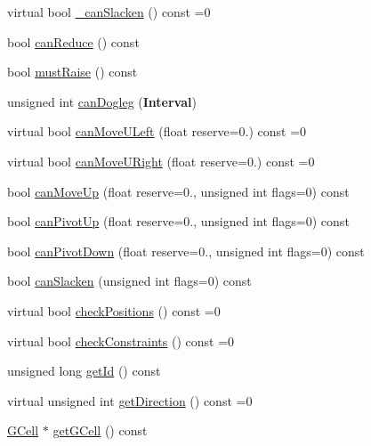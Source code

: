 \begin{DoxyCompactItemize}
\item 
virtual bool \hyperlink{classKatabatic_1_1AutoSegment_a676fcb7ece71d129b7a4d87a3f2e07aa}{\-\_\-can\-Slacken} () const =0
\item 
bool \hyperlink{classKatabatic_1_1AutoSegment_a6191fe9409cee6c5a0429ebb9e653ea4}{can\-Reduce} () const 
\item 
bool \hyperlink{classKatabatic_1_1AutoSegment_abe32548ca8d41da334413928405fec87}{must\-Raise} () const 
\item 
unsigned int \hyperlink{classKatabatic_1_1AutoSegment_a43c865bcfcfd6132352a9ac8a84c25cd}{can\-Dogleg} ({\bf Interval})
\item 
virtual bool \hyperlink{classKatabatic_1_1AutoSegment_aad55626c9d793a0b08bcff5be2a5ad0c}{can\-Move\-U\-Left} (float reserve=0.) const =0
\item 
virtual bool \hyperlink{classKatabatic_1_1AutoSegment_a096deb8a143f098eac2bff9ab9c52243}{can\-Move\-U\-Right} (float reserve=0.) const =0
\item 
bool \hyperlink{classKatabatic_1_1AutoSegment_a02e6ec81411b250d60dccc0da39964a6}{can\-Move\-Up} (float reserve=0., unsigned int flags=0) const 
\item 
bool \hyperlink{classKatabatic_1_1AutoSegment_af76432e1e58e015bde917134757003f9}{can\-Pivot\-Up} (float reserve=0., unsigned int flags=0) const 
\item 
bool \hyperlink{classKatabatic_1_1AutoSegment_a1c810a1a6860202d94c670999546c4b8}{can\-Pivot\-Down} (float reserve=0., unsigned int flags=0) const 
\item 
bool \hyperlink{classKatabatic_1_1AutoSegment_a46f380673fde750e88aad991168a35fd}{can\-Slacken} (unsigned int flags=0) const 
\item 
virtual bool \hyperlink{classKatabatic_1_1AutoSegment_af026a81002bd907f1ccd4a4784aaa1db}{check\-Positions} () const =0
\item 
virtual bool \hyperlink{classKatabatic_1_1AutoSegment_a3d5732fd10b4a05076981066a4674487}{check\-Constraints} () const =0
\item 
unsigned long \hyperlink{classKatabatic_1_1AutoSegment_ae68c47fdf838be02cbf6660cd25a0806}{get\-Id} () const 
\item 
virtual unsigned int \hyperlink{classKatabatic_1_1AutoSegment_ae35b78590ed6aa546b626ef95f28c533}{get\-Direction} () const =0
\item 
\hyperlink{classKatabatic_1_1GCell}{G\-Cell} $\ast$ \hyperlink{classKatabatic_1_1AutoSegment_ab45ccfee0f781ec16c50672663d36141}{get\-G\-Cell} () const 

\end{DoxyCompactItemize}
